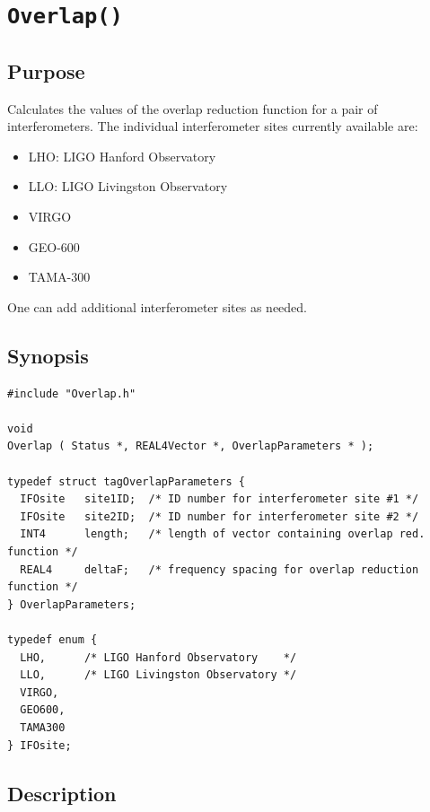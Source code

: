 \documentclass{article}
\begin{document}
\section{{\tt Overlap()}}

\subsection{Purpose}

Calculates the values of the overlap reduction function for a pair of 
interferometers.
The individual interferometer sites currently available are:
%
\begin{itemize}
\item LHO: LIGO Hanford Observatory
\item LLO: LIGO Livingston Observatory
\item VIRGO
\item GEO-600
\item TAMA-300
\end{itemize}
%
One can add additional interferometer sites as needed.

\subsection{Synopsis}

\begin{verbatim}
#include "Overlap.h"

void 
Overlap ( Status *, REAL4Vector *, OverlapParameters * );

typedef struct tagOverlapParameters {
  IFOsite   site1ID;  /* ID number for interferometer site #1 */
  IFOsite   site2ID;  /* ID number for interferometer site #2 */
  INT4      length;   /* length of vector containing overlap red. function */
  REAL4     deltaF;   /* frequency spacing for overlap reduction function */
} OverlapParameters;

typedef enum {
  LHO,      /* LIGO Hanford Observatory    */
  LLO,      /* LIGO Livingston Observatory */
  VIRGO,
  GEO600,
  TAMA300
} IFOsite;
\end{verbatim}

\subsection{Description}
\end{document}
